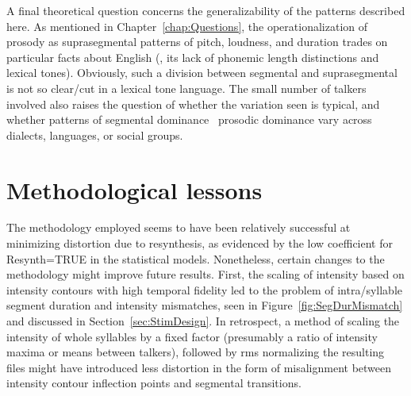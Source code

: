 A final theoretical question concerns the generalizability of the patterns described here.  As mentioned in Chapter~\ref{chap:Questions}, the operationalization of prosody as suprasegmental patterns of pitch, loudness, and duration trades on particular facts about English (\ie, its lack of phonemic length distinctions and lexical tones).  Obviously, such a division between segmental and suprasegmental is not so clear\-/cut in a lexical tone language.  The small number of talkers involved also raises the question of whether the variation seen is typical, and whether patterns of segmental dominance \vs\ prosodic dominance vary across dialects, languages, or social groups.


\section{Methodological lessons}
The methodology employed seems to have been relatively successful at minimizing distortion due to resynthesis, as evidenced by the low coefficient for {\inlinecode Resynth=TRUE} in the statistical models.  Nonetheless, certain changes to the methodology might improve future results.  First, the scaling of intensity based on intensity contours with high temporal fidelity led to the problem of intra\-/syllable segment duration and intensity mismatches, seen in Figure~\ref{fig:SegDurMismatch} and discussed in Section~\ref{sec:StimDesign}.  In retrospect, a method of scaling the intensity of whole syllables by a fixed factor (presumably a ratio of intensity maxima or means between talkers), followed by \ac{rms} normalizing the resulting files might have introduced less distortion in the form of misalignment between intensity contour inflection points and segmental transitions.

